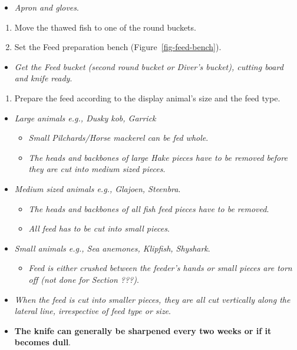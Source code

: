 \documentclass[
  letterpaper,
  DIV=11,
  numbers=noendperiod]{scrreprt}
\providecommand{\tightlist}{%
  \setlength{\itemsep}{0pt}\setlength{\parskip}{0pt}}\usepackage{longtable,booktabs,array}
\begin{document}
\begin{itemize}
\tightlist
\item
  \emph{Apron and gloves}.
\end{itemize}

\begin{enumerate}
\def\labelenumi{\arabic{enumi}.}
\setcounter{enumi}{5}
\tightlist
\item
  Move the thawed fish to one of the round buckets.
\item
  Set the Feed preparation bench (Figure~\ref{fig-feed-bench}).
\end{enumerate}

\begin{itemize}
\tightlist
\item
  \emph{Get the Feed bucket (second round bucket or Diver's bucket),
  cutting board and knife ready}.
\end{itemize}

\begin{enumerate}
\def\labelenumi{\arabic{enumi}.}
\setcounter{enumi}{7}
\tightlist
\item
  Prepare the feed according to the display animal's size and the feed
  type.
\end{enumerate}

\begin{itemize}
\item
  \emph{Large animals e.g., Dusky kob, Garrick}

  \begin{itemize}
  \tightlist
  \item
    \emph{Small Pilchards/Horse mackerel can be fed whole}.
  \item
    \emph{The heads and backbones of large Hake pieces have to be
    removed before they are cut into medium sized pieces}.
  \end{itemize}
\item
  \emph{Medium sized animals e.g., Glajoen, Steenbra}.

  \begin{itemize}
  \tightlist
  \item
    \emph{The heads and backbones of all fish feed pieces have to be
    removed}.
  \item
    \emph{All feed has to be cut into small pieces}.
  \end{itemize}
\item
  \emph{Small animals e.g., Sea anemones, Klipfish, Shyshark}.

  \begin{itemize}
  \tightlist
  \item
    \emph{Feed is either crushed between the feeder's hands or small
    pieces are torn off (not done for Section ???)}.
  \end{itemize}
\item
  \emph{When the feed is cut into smaller pieces, they are all cut
  vertically along the lateral line, irrespective of feed type or size}.
\item
  \textbf{The knife can generally be sharpened every two weeks or if it
  becomes dull}.
\end{itemize}
\end{document}
